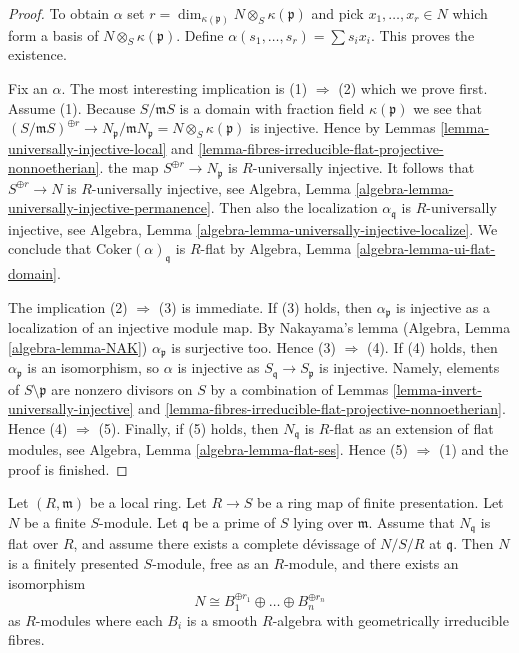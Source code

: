 \begin{proof}
To obtain $\alpha$ set
$r = \dim_{\kappa(\mathfrak p)} N \otimes_S \kappa(\mathfrak p)$ and pick
$x_1, \ldots, x_r \in N$ which form a basis of
$N \otimes_S \kappa(\mathfrak p)$. Define
$\alpha(s_1, \ldots, s_r) = \sum s_i x_i$. This proves the existence.

\medskip\noindent
Fix an $\alpha$. The most interesting implication is
(1) $\Rightarrow$ (2) which we prove first. Assume (1).
Because $S/\mathfrak mS$ is a domain with fraction field $\kappa(\mathfrak p)$
we see that
$(S/\mathfrak mS)^{\oplus r} \to
N_{\mathfrak p}/\mathfrak mN_{\mathfrak p} = N \otimes_S \kappa(\mathfrak p)$
is injective. Hence by
Lemmas \ref{lemma-universally-injective-local} and
\ref{lemma-fibres-irreducible-flat-projective-nonnoetherian}.
the map $S^{\oplus r} \to N_{\mathfrak p}$ is $R$-universally injective.
It follows that $S^{\oplus r} \to N$ is $R$-universally injective, see
Algebra, Lemma \ref{algebra-lemma-universally-injective-permanence}.
Then also the localization $\alpha_{\mathfrak q}$ is $R$-universally
injective, see
Algebra, Lemma \ref{algebra-lemma-universally-injective-localize}.
We conclude that $\text{Coker}(\alpha)_{\mathfrak q}$ is $R$-flat by
Algebra, Lemma \ref{algebra-lemma-ui-flat-domain}.

\medskip\noindent
The implication (2) $\Rightarrow$ (3) is immediate. If (3) holds, then
$\alpha_{\mathfrak p}$ is injective as a localization of an injective
module map. By Nakayama's lemma
(Algebra, Lemma \ref{algebra-lemma-NAK})
$\alpha_{\mathfrak p}$ is surjective too. Hence (3) $\Rightarrow$ (4).
If (4) holds, then $\alpha_{\mathfrak p}$ is an isomorphism, so
$\alpha$ is injective as $S_{\mathfrak q} \to S_{\mathfrak p}$ is injective.
Namely, elements of $S \setminus \mathfrak p$ are nonzero divisors on $S$
by a combination of
Lemmas \ref{lemma-invert-universally-injective} and
\ref{lemma-fibres-irreducible-flat-projective-nonnoetherian}.
Hence (4) $\Rightarrow$ (5). Finally, if (5) holds, then
$N_{\mathfrak q}$ is $R$-flat as an extension of flat modules, see
Algebra, Lemma \ref{algebra-lemma-flat-ses}.
Hence (5) $\Rightarrow$ (1) and the proof is finished.
\end{proof}

\begin{lemma}
\label{lemma-complete-devissage-flat-finite-type-module}
Let $(R, \mathfrak m)$ be a local ring.
Let $R \to S$ be a ring map of finite presentation.
Let $N$ be a finite $S$-module.
Let $\mathfrak q$ be a prime of $S$ lying over $\mathfrak m$.
Assume that $N_{\mathfrak q}$ is flat over $R$, and
assume there exists a complete d\'evissage of $N/S/R$ at $\mathfrak q$.
Then $N$ is a finitely presented $S$-module, free as an $R$-module,
and there exists an isomorphism
$$
N \cong B_1^{\oplus r_1} \oplus \ldots \oplus B_n^{\oplus r_n}
$$
as $R$-modules where each $B_i$ is a smooth $R$-algebra with geometrically
irreducible fibres.
\end{lemma}

